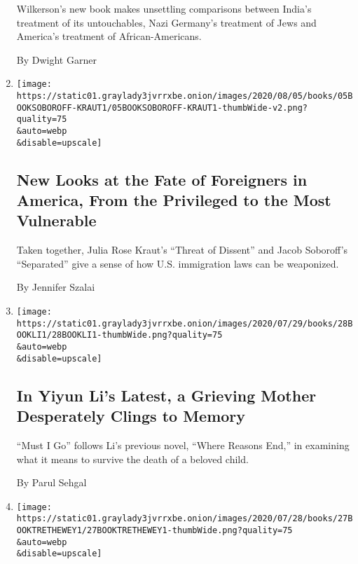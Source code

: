 \begin{enumerate}
  Wilkerson's new book makes unsettling comparisons between India's
  treatment of its untouchables, Nazi Germany's treatment of Jews and
  America's treatment of African-Americans.

  By Dwight Garner
\item
  \href{/2020/07/30/books/review-threat-dissent-julia-rose-kraut-separated-jacob-soboroff.html}{}

  \texttt{[image: https://static01.graylady3jvrrxbe.onion/images/2020/08/05/books/05BOOKSOBOROFF-KRAUT1/05BOOKSOBOROFF-KRAUT1-thumbWide-v2.png?quality=75\\\&auto=webp\\\&disable=upscale]}

  \hypertarget{new-looks-at-the-fate-of-foreigners-in-america-from-the-privileged-to-the-most-vulnerable}{%
  \subsection{New Looks at the Fate of Foreigners in America, From the
  Privileged to the Most
  Vulnerable}\label{new-looks-at-the-fate-of-foreigners-in-america-from-the-privileged-to-the-most-vulnerable}}

  Taken together, Julia Rose Kraut's ``Threat of Dissent'' and Jacob
  Soboroff's ``Separated'' give a sense of how U.S. immigration laws can
  be weaponized.

  By Jennifer Szalai
\item
  \href{/2020/07/28/books/review-must-i-go-yiyun-li.html}{}

  \texttt{[image: https://static01.graylady3jvrrxbe.onion/images/2020/07/29/books/28BOOKLI1/28BOOKLI1-thumbWide.png?quality=75\\\&auto=webp\\\&disable=upscale]}

  \hypertarget{in-yiyun-lis-latest-a-grieving-mother-desperately-clings-to-memory}{%
  \subsection{In Yiyun Li's Latest, a Grieving Mother Desperately Clings
  to
  Memory}\label{in-yiyun-lis-latest-a-grieving-mother-desperately-clings-to-memory}}

  ``Must I Go'' follows Li's previous novel, ``Where Reasons End,'' in
  examining what it means to survive the death of a beloved child.

  By Parul Sehgal
\item
  \href{/2020/07/27/books/review-memorial-drive-memoir-natasha-trethewey.html}{}

  \texttt{[image: https://static01.graylady3jvrrxbe.onion/images/2020/07/28/books/27BOOKTRETHEWEY1/27BOOKTRETHEWEY1-thumbWide.png?quality=75\\\&auto=webp\\\&disable=upscale]}


\end{enumerate}

